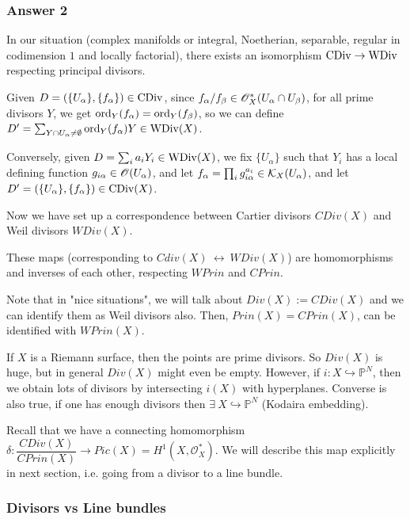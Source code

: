 \subsubsection{Answer 2}
In our situation (complex manifolds or integral, Noetherian, separable, regular in codimension $1$ and locally factorial), 
there exists an isomorphism $\operatorname{CDiv} \to \operatorname{WDiv}$ respecting principal divisors. 

Given $D = (\{U_\alpha\}, \{f_\alpha\}) \in \operatorname{CDiv}$, since $f_\alpha/f_\beta \in \mathscr{O}^*_X(U_\alpha\cap U_\beta)$, for all prime divisors $Y$, we get $\operatorname{ord}_Y(f_\alpha) = \operatorname{ord}_Y(f_\beta)$, so we can define $D' = \sum_{Y \cap U_\alpha \neq \emptyset}\operatorname{ord}_Y(f_\alpha) Y \in \operatorname{WDiv}(X)$.

Conversely, given $D = \sum_i a_i Y_i \in \operatorname{WDiv}(X)$, we fix $\{U_\alpha\}$ such that $Y_i$ has a local defining function $g_{i\alpha} \in \mathscr{O}(U_\alpha)$, and let $f_\alpha = \prod_i g_{i\alpha}^{a_i} \in \mathcal{K}_X(U_\alpha)$, and let $D' = (\{U_\alpha\}, \{f_\alpha\}) \in \operatorname{CDiv}(X)$.



Now we have set up a correspondence between Cartier divisors $CDiv(X)$ and Weil divisors $WDiv(X)$.

\begin{lemma}
 These maps (corresponding to $Cdiv(X)~\leftrightarrow~WDiv(X)$) are homomorphisms and inverses of each other, respecting $WPrin$ and $CPrin$.
\end{lemma}

Note that in "nice situations", we will talk about $Div(X):= CDiv(X)$ and we can identify them as Weil divisors also. Then, $Prin(X)= CPrin(X)$, can be identified with $WPrin(X)$.

\begin{remark}
If $X$ is a Riemann surface, then the points are prime divisors. So $Div(X)$ is huge, but in general $Div(X)$ might even be empty. However, if $i: X \hookrightarrow \mathbb{P}^N$, then we obtain lots of divisors by intersecting $i(X)$ with hyperplanes. Converse is also true, if one has enough divisors then $\exists~ X \hookrightarrow \mathbb{P}^N$ (Kodaira embedding).

\end{remark}
Recall that we have a connecting homomorphism $\delta: \dfrac{CDiv(X)}{CPrin(X)} \rightarrow Pic(X)= H^1(X,\mathcal{O}^{*}_X)$. We will describe this map explicitly in next section, i.e. going from a divisor to a line bundle.

\subsubsection{Divisors vs Line bundles}

